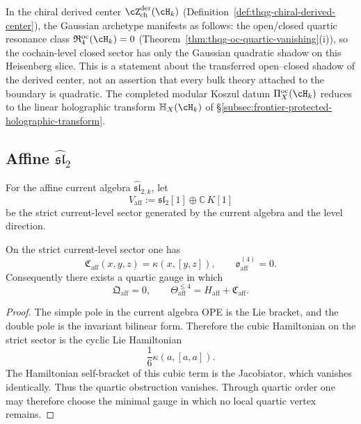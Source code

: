 \begin{remark}
\label{rem:nms-heisenberg-derived-center}
In the chiral derived center $\cZ^{\mathrm{der}}_{\mathrm{ch}}(\cH_k)$
(Definition~\ref{def:thqg-chiral-derived-center}), the Gaussian
archetype manifests as follows:
the open/closed quartic resonance class
$\mathfrak{R}^{\mathrm{oc}}_4(\cH_k) = 0$
(Theorem~\ref{thm:thqg-oc-quartic-vanishing}(i)),
so the cochain-level closed sector has only the Gaussian quadratic shadow on
this Heisenberg slice.  This is a statement about the transferred
open--closed shadow of the derived center, not an assertion that every
bulk theory attached to the boundary is quadratic.
The completed modular Koszul datum
$\Pi^{\mathrm{oc}}_X(\cH_k)$ reduces to the linear holographic
transform $\mathbb{H}_X(\cH_k)$ of
\S\ref{subsec:frontier-protected-holographic-transform}.
\end{remark}

\subsection{Affine \texorpdfstring{$\widehat{\mathfrak{sl}}_2$}{sl2}}
\label{subsec:nms-affine-sl2}

\begin{definition}
\label{def:nms-affine-sector}
For the affine current algebra $\widehat{\mathfrak{sl}}_{2,k}$, let
\[
V_{\mathrm{aff}}:=\mathfrak{sl}_2[1]\oplus \mathbb C\,K[1]
\]
be the strict current-level sector generated by the current algebra and the level direction.
\end{definition}

\begin{theorem}
\label{thm:nms-affine-cubic-normal-form}
On the strict current-level sector one has
\[
\mathfrak C_{\mathrm{aff}}(x,y,z)=\kappa(x,[y,z]),
\qquad
\mathfrak o_{\mathrm{aff}}^{(4)}=0.
\]
Consequently there exists a quartic gauge in which
\[
\mathfrak Q_{\mathrm{aff}}=0,
\qquad
\Theta_{\mathrm{aff}}^{\le 4}=H_{\mathrm{aff}}+\mathfrak C_{\mathrm{aff}}.
\]
\end{theorem}

\begin{proof}
The simple pole in the current algebra OPE is the Lie bracket, and the double pole is the invariant bilinear form. Therefore the cubic Hamiltonian on the strict sector is the cyclic Lie Hamiltonian
\[
\frac16\kappa(a,[a,a]).
\]
The Hamiltonian self-bracket of this cubic term is the Jacobiator, which vanishes identically. Thus the quartic obstruction vanishes. Through quartic order one may therefore choose the minimal gauge in which no local quartic vertex remains.\qedhere
\end{proof}

